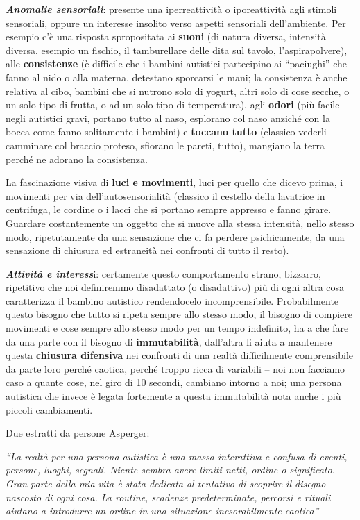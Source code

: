 \emph{\textbf{Anomalie sensoriali}}: presente una iperreattività o
iporeattività agli stimoli sensoriali, oppure un interesse insolito
verso aspetti sensoriali dell'ambiente. Per esempio c'è una risposta
spropositata ai \textbf{suoni} (di natura diversa, intensità diversa,
esempio un fischio, il tamburellare delle dita sul tavolo,
l'aspirapolvere), alle \textbf{consistenze} (è difficile che i bambini
autistici partecipino ai ``paciughi'' che fanno al nido o alla materna,
detestano sporcarsi le mani; la consistenza è anche relativa al cibo,
bambini che si nutrono solo di yogurt, altri solo di cose secche, o un
solo tipo di frutta, o ad un solo tipo di temperatura), agli
\textbf{odori} (più facile negli autistici gravi, portano tutto al naso,
esplorano col naso anziché con la bocca come fanno solitamente i
bambini) e \textbf{toccano tutto} (classico vederli camminare col
braccio proteso, sfiorano le pareti, tutto), mangiano la terra perché ne
adorano la consistenza.

La fascinazione visiva di \textbf{luci e movimenti}, luci per quello che
dicevo prima, i movimenti per via dell'autosensorialità (classico il
cestello della lavatrice in centrifuga, le cordine o i lacci che si
portano sempre appresso e fanno girare. Guardare costantemente un
oggetto che si muove alla stessa intensità, nello stesso modo,
ripetutamente da una sensazione che ci fa perdere psichicamente, da una
sensazione di chiusura ed estraneità nei confronti di tutto il resto).

\emph{\textbf{Attività e interess}}i: certamente questo comportamento
strano, bizzarro, ripetitivo che noi definiremmo disadattato (o
disadattivo) più di ogni altra cosa caratterizza il bambino autistico
rendendocelo incomprensibile. Probabilmente questo bisogno che tutto si
ripeta sempre allo stesso modo, il bisogno di compiere movimenti e cose
sempre allo stesso modo per un tempo indefinito, ha a che fare da una
parte con il bisogno di \textbf{immutabilità}, dall'altra li aiuta a
mantenere questa \textbf{chiusura difensiva} nei confronti di una realtà
difficilmente comprensibile da parte loro perché caotica, perché troppo
ricca di variabili -- noi non facciamo caso a quante cose, nel giro di
10 secondi, cambiano intorno a noi; una persona autistica che invece è
legata fortemente a questa immutabilità nota anche i più piccoli
cambiamenti.

Due estratti da persone Asperger:

\emph{``La realtà per una persona autistica è una massa interattiva e
confusa di eventi, persone, luoghi, segnali. Niente sembra avere limiti
netti, ordine o significato. Gran parte della mia vita è stata dedicata
al tentativo di scoprire il disegno nascosto di ogni cosa. La routine,
scadenze predeterminate, percorsi e rituali aiutano a introdurre un
ordine in una situazione inesorabilmente caotica'' }

